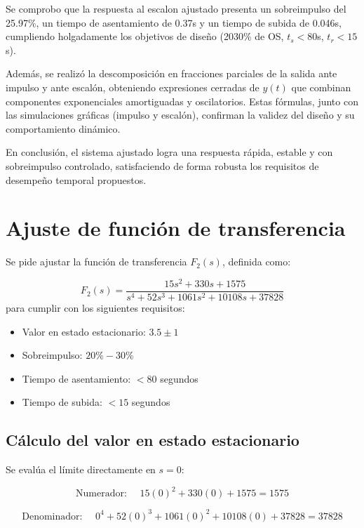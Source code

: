\documentclass[11pt,letterpaper]{article}
\begin{document}
Se comprobo que la respuesta al escalon ajustado presenta un sobreimpulso del 25.97\%, un tiempo de asentamiento de 0.37s y un tiempo de subida de 0.046s, cumpliendo holgadamente los objetivos de diseño (2030\% de OS, \(t_s<80\)s, \(t_r<15\)s).

Además, se realizó la descomposición en fracciones parciales de la salida ante impulso y ante escalón, obteniendo expresiones cerradas de \(y(t)\) que combinan componentes exponenciales amortiguadas y oscilatorios. Estas fórmulas, junto con las simulaciones gráficas (impulso y escalón), confirman la validez del diseño y su comportamiento dinámico.

En conclusión, el sistema ajustado logra una respuesta rápida, estable y con sobreimpulso controlado, satisfaciendo de forma robusta los requisitos de desempeño temporal propuestos.

\newpage

\section{Ajuste de función de transferencia}
Se pide ajustar la función de transferencia \( F_2(s) \), definida como:

\begin{equation}
F_2(s) = \frac{15s^2 + 330s + 1575}{s^4 + 52s^3 + 1061s^2 + 10108s + 37828}
\end{equation}
para cumplir con los siguientes requisitos:
\begin{itemize}
    \item Valor en estado estacionario: \( 3.5 \pm 1 \)
    \item Sobreimpulso: \( 20\% - 30\% \)
    \item Tiempo de asentamiento: \( < 80 \) segundos
    \item Tiempo de subida: \( < 15 \) segundos
\end{itemize}

\subsection{Cálculo del valor en estado estacionario}

Se evalúa el límite directamente en \( s = 0 \):

\begin{equation}
\text{Numerador: } \quad 15(0)^2 + 330(0) + 1575 = 1575
\end{equation}

\begin{equation}
\text{Denominador: } \quad 0^4 + 52(0)^3 + 1061(0)^2 + 10108(0) + 37828 = 37828
\end{equation}
\end{document}
